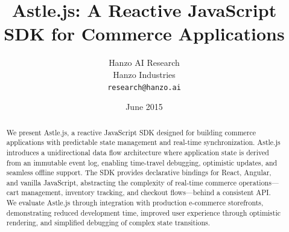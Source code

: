 \documentclass[11pt,twocolumn]{article}
\title{Astle.js: A Reactive JavaScript SDK for Commerce Applications}
\author{Hanzo AI Research\\
Hanzo Industries\\
\texttt{research@hanzo.ai}}
\date{June 2015}
\begin{document}
\hanzocoverpage

\begin{abstract}
We present Astle.js, a reactive JavaScript SDK designed for building commerce applications with predictable state management and real-time synchronization. Astle.js introduces a unidirectional data flow architecture where application state is derived from an immutable event log, enabling time-travel debugging, optimistic updates, and seamless offline support. The SDK provides declarative bindings for React, Angular, and vanilla JavaScript, abstracting the complexity of real-time commerce operations—cart management, inventory tracking, and checkout flows—behind a consistent API. We evaluate Astle.js through integration with production e-commerce storefronts, demonstrating reduced development time, improved user experience through optimistic rendering, and simplified debugging of complex state transitions.
\end{abstract}









\end{document}
